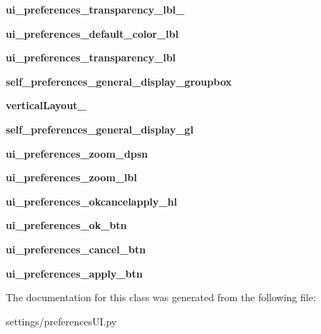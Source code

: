 \begin{DoxyCompactItemize}
{\bfseries ui\+\_\+preferences\+\_\+transparency\+\_\+lbl\+\_}
\item 
\hypertarget{a00113_a2469ae136e448dd1df44686ae61f5f01}{}\label{a00113_a2469ae136e448dd1df44686ae61f5f01} 
{\bfseries ui\+\_\+preferences\+\_\+default\+\_\+color\+\_\+lbl}
\item 
\hypertarget{a00113_a243905c4e84872947db1bb8dcedadda4}{}\label{a00113_a243905c4e84872947db1bb8dcedadda4} 
{\bfseries ui\+\_\+preferences\+\_\+transparency\+\_\+lbl}
\item 
\hypertarget{a00113_a24dafe3bdccfb5c2439cca09d041f8e2}{}\label{a00113_a24dafe3bdccfb5c2439cca09d041f8e2} 
{\bfseries self\+\_\+preferences\+\_\+general\+\_\+display\+\_\+groupbox}
\item 
\hypertarget{a00113_a770a35129466bdc08cfc70c1a31d74d0}{}\label{a00113_a770a35129466bdc08cfc70c1a31d74d0} 
{\bfseries vertical\+Layout\+\_}
\item 
\hypertarget{a00113_a34e66b85aedb9d531bd13e099c4abd17}{}\label{a00113_a34e66b85aedb9d531bd13e099c4abd17} 
{\bfseries self\+\_\+preferences\+\_\+general\+\_\+display\+\_\+gl}
\item 
\hypertarget{a00113_ab9f4bd205de45a28fb6df5fd10a11e13}{}\label{a00113_ab9f4bd205de45a28fb6df5fd10a11e13} 
{\bfseries ui\+\_\+preferences\+\_\+zoom\+\_\+dpsn}
\item 
\hypertarget{a00113_a8321ca1cf385acdcd4a23a9aeba71982}{}\label{a00113_a8321ca1cf385acdcd4a23a9aeba71982} 
{\bfseries ui\+\_\+preferences\+\_\+zoom\+\_\+lbl}
\item 
\hypertarget{a00113_abeeea5dce817fab1714dcfea02931865}{}\label{a00113_abeeea5dce817fab1714dcfea02931865} 
{\bfseries ui\+\_\+preferences\+\_\+okcancelapply\+\_\+hl}
\item 
\hypertarget{a00113_a191d2ad10ffb160b79b7795e05fe37e3}{}\label{a00113_a191d2ad10ffb160b79b7795e05fe37e3} 
{\bfseries ui\+\_\+preferences\+\_\+ok\+\_\+btn}
\item 
\hypertarget{a00113_a47ad79d67a89e77f0cf358171fac15b2}{}\label{a00113_a47ad79d67a89e77f0cf358171fac15b2} 
{\bfseries ui\+\_\+preferences\+\_\+cancel\+\_\+btn}
\item 
\hypertarget{a00113_a3f0de42b6f49c050f03b806cfc7541f7}{}\label{a00113_a3f0de42b6f49c050f03b806cfc7541f7} 
{\bfseries ui\+\_\+preferences\+\_\+apply\+\_\+btn}
\end{DoxyCompactItemize}


The documentation for this class was generated from the following file\+:\begin{DoxyCompactItemize}
\item 
settings/preferences\+U\+I.\+py\end{DoxyCompactItemize}
